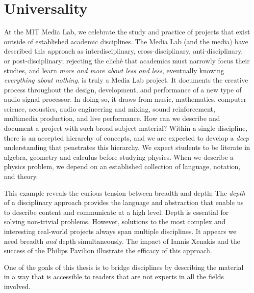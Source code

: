 \section{Universality}
\label{sec:universality}
At the MIT Media Lab, we celebrate the study and practice of projects
that exist outside of established academic disciplines. The Media Lab
(and the media) have described this approach as interdisciplinary,
cross-disciplinary, anti-disciplinary, or post-disciplinary; rejecting
the clich\'{e} that academics must narrowly focus their studies, and
learn \textit{more and more about less and less}, eventually knowing
\textit{everything about nothing}.  \thesis is truly a Media Lab
project. It documents the creative process throughout the design,
development, and performance of a new type of audio signal
processor. In doing so, it draws from music, mathematics, computer
science, acoustics, audio engineering and mixing, sound reinforcement,
multimedia production, and live performance. How can we describe and
document a project with such broad subject material? Within a single
discipline, there is an accepted hierarchy of concepts, and we are
expected to develop a \emph{deep} understanding that penetrates this
hierarchy. We expect students to be literate in algebra, geometry and
calculus before studying physics. When we describe a physics problem,
we depend on an established collection of language, notation, and
theory.

This example reveals the curious tension between breadth and depth:
The \textit{depth} of a disciplinary approach provides the language
and abstraction that enable us to describe content and communicate at
a high level. Depth is essential for solving non-trivial
problems. However, solutions to the most complex and interesting
real-world projects always span multiple disciplines. It appears we
need breadth \emph{and} depth simultaneously. The impact of Iannis
Xenakis and the success of the Philips Pavilion illustrate the
efficacy of this approach. 


One of the goals of this thesis is to
bridge disciplines by describing the material in a way that is
accessible to readers that are not experts in all the fields
involved.


